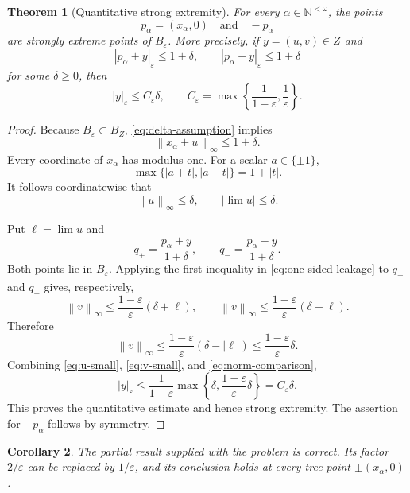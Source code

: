 \documentclass[11pt]{article}
\newtheorem{theorem}{Theorem}[section]
\newtheorem{corollary}[theorem]{Corollary}
\newcommand{\N}{\mathbb N}
\newcommand{\eps}{\varepsilon}
\newcommand{\norm}[1]{\left\lVert #1\right\rVert}
\newcommand{\abs}[1]{\left\lvert #1\right\rvert}
\newcommand{\sourceNorm}[1]{\left\lvert #1\right\rvert_{\eps}}
\begin{document}
\begin{theorem}[Quantitative strong extremity]
\label{thm:tree-strong}
For every $\alpha\in\N^{<\omega}$, the points
\[
 p_\alpha=(x_\alpha,0)
 \quad\text{and}\quad
 -p_\alpha
\]
are strongly extreme points of $B_\eps$.  More precisely, if $y=(u,v)\in Z$ and
\begin{equation}
\label{eq:delta-assumption}
 \sourceNorm{p_\alpha+y}\le1+\delta,
 \qquad
 \sourceNorm{p_\alpha-y}\le1+\delta
\end{equation}
for some $\delta\ge0$, then
\begin{equation}
\label{eq:strong-modulus}
 \sourceNorm{y}
 \le C_\eps\delta,
 \qquad
 C_\eps=\max\left\{\frac1{1-\eps},\frac1\eps\right\}.
\end{equation}
\end{theorem}

\begin{proof}
Because $B_\eps\subset B_Z$, \eqref{eq:delta-assumption} implies
\[
 \norm{x_\alpha\pm u}_\infty\le1+\delta.
\]
Every coordinate of $x_\alpha$ has modulus one.  For a scalar $a\in\{\pm1\}$,
\[
 \max\{\abs{a+t},\abs{a-t}\}=1+\abs{t}.
\]
It follows coordinatewise that
\begin{equation}
\label{eq:u-small}
 \norm{u}_\infty\le\delta,
 \qquad
 \abs{\lim u}\le\delta.
\end{equation}

Put $\ell=\lim u$ and
\[
 q_+=\frac{p_\alpha+y}{1+\delta},
 \qquad
 q_-=\frac{p_\alpha-y}{1+\delta}.
\]
Both points lie in $B_\eps$.  Applying the first inequality in \eqref{eq:one-sided-leakage} to $q_+$ and $q_-$ gives, respectively,
\[
 \norm{v}_\infty
 \le \frac{1-\eps}{\eps}(\delta+\ell),
 \qquad
 \norm{v}_\infty
 \le \frac{1-\eps}{\eps}(\delta-\ell).
\]
Therefore
\begin{equation}
\label{eq:v-small}
 \norm{v}_\infty
 \le\frac{1-\eps}{\eps}(\delta-\abs{\ell})
 \le\frac{1-\eps}{\eps}\delta.
\end{equation}
Combining \eqref{eq:u-small}, \eqref{eq:v-small}, and \eqref{eq:norm-comparison},
\[
 \sourceNorm{y}
 \le\frac1{1-\eps}\max\left\{\delta,\frac{1-\eps}{\eps}\delta\right\}
 =C_\eps\delta.
\]
This proves the quantitative estimate and hence strong extremity.  The assertion for $-p_\alpha$ follows by symmetry.
\end{proof}

\begin{corollary}
\label{cor:partial-correct}
The partial result supplied with the problem is correct.  Its factor $2/\eps$ can be replaced by $1/\eps$, and its conclusion holds at every tree point $\pm(x_\alpha,0)$.
\end{corollary}
\end{document}
